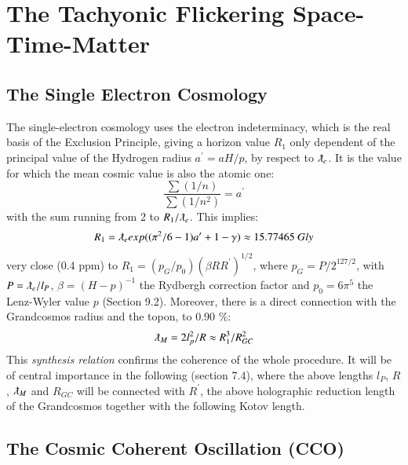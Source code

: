 \documentclass[twoside,draft]{article}
\begin{document}
\begin{sloppypar}
\section{The Tachyonic Flickering Space-Time-Matter}

\subsection{The Single Electron Cosmology}

The single-electron cosmology \cite{Sanchez1} uses the electron indeterminacy, which is the real basis of the Exclusion Principle, giving a horizon value $R_1$ only dependent of the principal value of the Hydrogen radius $a^{\prime} = aH/p$, by respect to $\lambdabar_e$. It is the value for which the mean cosmic value is also the atomic one:
\begin{equation}
\frac{\sum(1/n)}{\sum(1/n^{2})} = a^{\prime}
\end{equation}
with the sum running from 2 to $R_{1} /\lambdabar_{e}$. This implies:
$$
R_{1} = \lambdabar_{e} exp((\pi^{2} /6 - 1)a^{\prime} + 1 - \gamma) \approx 15.77465 ~ Gly
$$
very close (0.4 ppm) to $R_{1} = ( p_{G} /p_{0} )(\beta R R^{\prime})^{1/2}$, where $p_{G} = P/2^{127/2}$, with $P = \lambdabar_e / l_P$, $\beta = (H - p)^{-1}$ the Rydbergh correction factor and $p_{0} = 6\pi^{5}$ the Lenz-Wyler value $p$ (Section 9.2). Moreover, there is a direct connection with the Grandcosmos radius and the topon, to 0.90 \%:
\begin{equation}
\lambdabar_M = 2l_p^2/R \approx R_1^3/R_{GC}^2
\end{equation}  
This \textit{synthesis relation} confirms the coherence of the whole procedure. It will be of central importance in the following (section 7.4), where the above lengths $l_P$, $R$, $\lambdabar_M$ and $R_{GC}$ will be connected with $R^{\prime}$, the above holographic reduction length of the Grandcosmos together with the following Kotov length. 

\subsection{The Cosmic Coherent Oscillation (CCO)}


\end{sloppypar}
\end{document}
